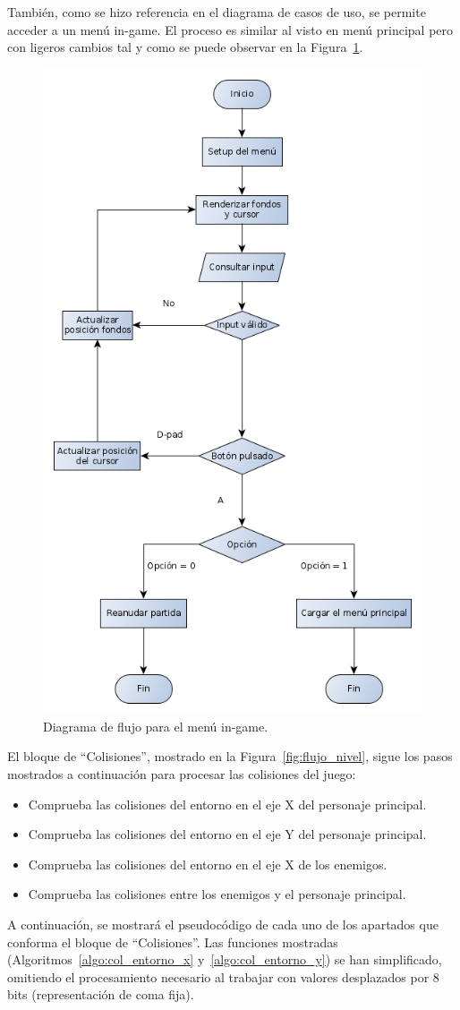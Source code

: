 También, como se hizo referencia en el diagrama de casos de uso, se permite acceder a un menú in-game. El proceso es similar al visto en menú principal pero con ligeros cambios tal y como se puede observar en la Figura~\ref{fig:flujo_ingame}.


\begin{figure}[h]
	\centering
	\includegraphics[width=.5\textwidth]{capitulos/diagramas/flujo_ingame.png}
	\caption{Diagrama de flujo para el menú in-game.}\label{fig:flujo_ingame}
\end{figure}
\FloatBarrier{}

El bloque de ``Colisiones'', mostrado en la Figura~\ref{fig:flujo_nivel}, sigue los pasos mostrados a continuación para procesar las colisiones del juego:

\begin{itemize}
	\item Comprueba las colisiones del entorno en el eje X del personaje principal.
	\item Comprueba las colisiones del entorno en el eje Y del personaje principal.
	\item Comprueba las colisiones del entorno en el eje X de los enemigos.
	\item Comprueba las colisiones entre los enemigos y el personaje principal.
\end{itemize}

A continuación, se mostrará el pseudocódigo de cada uno de los apartados que conforma el bloque de ``Colisiones''. Las funciones mostradas (Algoritmos~\ref{algo:col_entorno_x} y~\ref{algo:col_entorno_y}) se han simplificado, omitiendo el procesamiento necesario al trabajar con valores desplazados por 8 bits (representación de coma fija).

